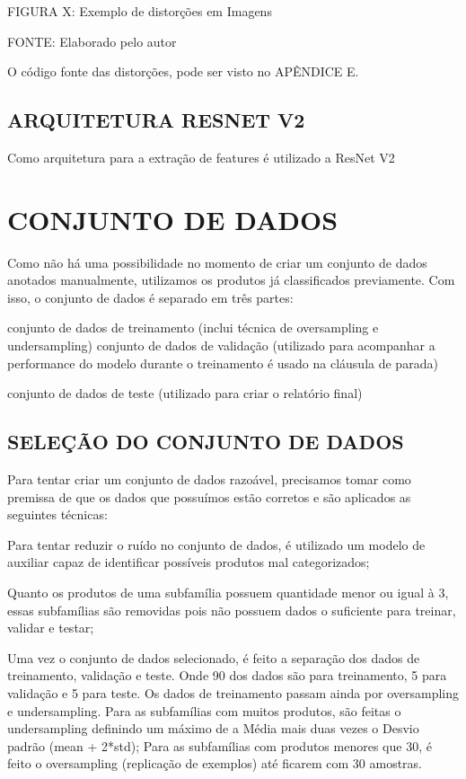 FIGURA X: Exemplo de distorções em Imagens

FONTE: Elaborado pelo autor

O código fonte das distorções, pode ser visto no APÊNDICE E.

\subsection{ARQUITETURA RESNET V2}

Como arquitetura para a extração de features é utilizado a ResNet V2 

\section{CONJUNTO DE DADOS}
Como não há uma possibilidade no momento de criar um conjunto de dados anotados manualmente, utilizamos os produtos já classificados previamente.     Com isso, o conjunto de dados é separado em três partes:

conjunto de dados de treinamento (inclui técnica de oversampling e undersampling)
conjunto de dados de validação (utilizado para acompanhar a performance do modelo durante o treinamento é usado na cláusula de parada)

conjunto de dados de teste (utilizado para criar o relatório final)

\subsection{SELEÇÃO DO CONJUNTO DE DADOS}

Para tentar criar um conjunto de dados razoável, precisamos tomar como premissa de que os dados que possuímos estão corretos e são aplicados as seguintes técnicas:

Para tentar reduzir o ruído no conjunto de dados, é utilizado um modelo de auxiliar capaz de identificar possíveis produtos mal categorizados;

Quanto os produtos de uma subfamília possuem quantidade menor ou igual à 3, essas subfamílias são removidas pois não possuem dados o suficiente para treinar, validar e testar;

Uma vez o conjunto de dados selecionado, é feito a separação dos dados de treinamento, validação e teste. Onde 90 dos dados são para treinamento, 5 para validação e 5 para teste. Os dados de treinamento passam ainda por oversampling e undersampling.
Para as subfamílias com muitos produtos, são feitas o undersampling definindo um máximo de a Média mais duas vezes o Desvio padrão (mean + 2*std);
Para as subfamílias com produtos menores que 30, é feito o oversampling (replicação de exemplos) até ficarem com 30 amostras.

